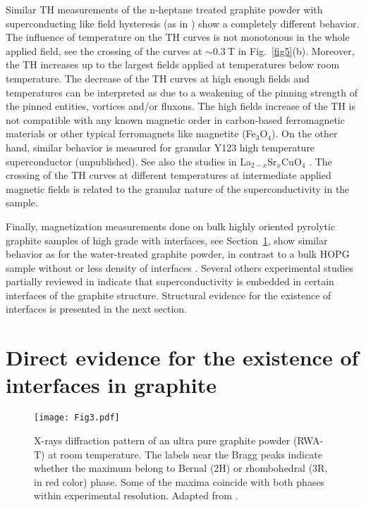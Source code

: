 \documentclass[aps,dvipsnames,twocolumn,floatfix,amsmath]{revtex4-1}
\begin{document}
Similar TH measurements of the n-heptane treated graphite powder
with superconducting like field hysteresis (as in
\cite{sch12,schcar}) show a completely different behavior. The
influence of temperature on the TH curves is not monotonous in the
whole applied field, see the crossing of the curves at $\sim
0.3~$T in Fig.~\ref{fig5}(b). Moreover, the TH increases up to the
largest fields applied at temperatures below room temperature.
The decrease of the TH curves at  high enough fields and
temperatures can be interpreted as due to a weakening of the
pinning strength of the pinned entities, vortices and/or fluxons.
The high fields increase of the TH is not compatible with any
known magnetic order in carbon-based ferromagnetic materials or
other typical ferromagnets like magnetite (Fe$_3$O$_4$). On the
other hand, similar behavior is measured for granular Y123 high
temperature superconductor (unpublished). See also the studies
 in La$_{2-x}$Sr${_x}$CuO$_4$
 \cite{pan04,maj05}.  The crossing of the TH
curves at different temperatures at intermediate applied magnetic
fields is related to the granular
nature of the superconductivity in the sample.

Finally, magnetization measurements done on bulk highly oriented
pyrolytic graphite samples of high grade with interfaces, see
Section~\ref{inter}, show similar behavior as for the
water-treated graphite powder, in contrast to a bulk HOPG sample
without or less density of interfaces \cite{schcar}.
Several others experimental studies
partially reviewed in \cite{esqpip,chap7} indicate that superconductivity is embedded in
certain interfaces of the graphite structure. Structural evidence
for the existence of interfaces is presented in the next section.


\section{Direct evidence for the existence of interfaces in graphite}
\label{inter}

\begin{figure}
  \texttt{[image: Fig3.pdf]}
\caption{X-rays diffraction pattern of an ultra pure graphite
powder (RWA-T) at room temperature. The labels near the Bragg
peaks indicate whether the maximum belong to Bernal (2H) or
rhombohedral (3R, in red color) phase. Some of the maxima coincide
with both phases within experimental resolution. Adapted from
\cite{pre16}.}
\label{XRD}       %
\end{figure}
\end{document}
